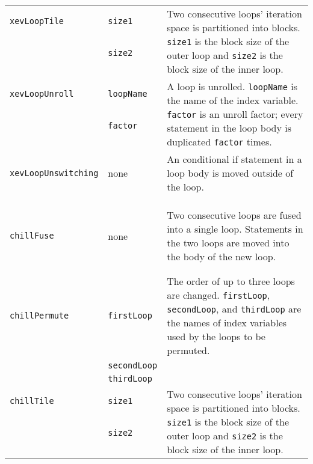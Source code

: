 \begin{longtable}[l]{l|l|l}
\texttt{xevLoopTile} & \texttt{size1} & \multirow{3}{9cm}{
Two consecutive loops' iteration space is partitioned into blocks. \texttt{size1} is
 the block size of the outer loop and  \texttt{size2} is the block size of the inner loop.} \\
& \texttt{size2} &\\
&  &\\ \hline

\texttt{xevLoopUnroll} & \texttt{loopName} & \multirow{3}{9cm}{A loop is
 unrolled. \texttt{loopName} is the name of the index
 variable. \texttt{factor} is an unroll factor; every
 statement in the loop body is duplicated \texttt{factor} times.} \\ &
 \texttt{factor} & \\ &&\\ \hline

\texttt{xevLoopUnswitching} & none & \multirow{1}{9cm}{An conditional
if statement in a loop body is moved outside of the loop.} \\
 &&\\ &&\\ \hline

\pagebreak

 \multicolumn{3}{l}{CHiLL-compatible versions of optimization rules}\\\hline

 \texttt{chillFuse} & none & \multirow{1}{9cm}{Two consecutive loops are
 fused into a single loop. Statements in the two loops are moved into
 the body of the new loop.} \\
 &&\\ &&\\ \hline

 \texttt{chillPermute} & \texttt{firstLoop} & \multirow{1}{9cm}{The order of up to
 three loops are changed. \texttt{firstLoop}, \texttt{secondLoop}, and
 \texttt{thirdLoop} are the names of index variables used by the loops
 to be permuted.} \\
 &\texttt{secondLoop}&\\ &\texttt{thirdLoop}&\\ \hline


\texttt{chillTile} & \texttt{size1} & \multirow{3}{9cm}{
Two consecutive loops' iteration space is partitioned into blocks. \texttt{size1} is
 the block size of the outer loop and  \texttt{size2} is the block size of the inner loop.} \\
& \texttt{size2} &\\
&  &\\ \hline


\end{longtable}
